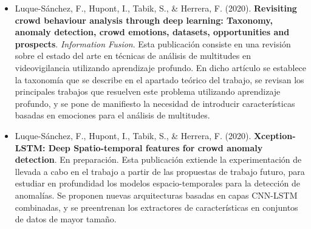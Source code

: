 \documentclass[../main.tex]{memoir}
\begin{document}
\begin{itemize}
\item Luque-Sánchez, F., Hupont, I., Tabik, S., \& Herrera,
  F. (2020). \textbf{Revisiting crowd behaviour analysis through deep
  learning: Taxonomy, anomaly detection, crowd emotions, datasets,
  opportunities and prospects}. \textit{Information Fusion}. Esta
  publicación consiste en una revisión sobre el estado del arte en
  técnicas de análisis de multitudes en videovigilancia utilizando
  aprendizaje profundo. En dicho artículo se establece la taxonomía
  que se describe en el apartado teórico del trabajo, se revisan los
  principales trabajos que resuelven este problema utilizando
  aprendizaje profundo, y se pone de manifiesto la necesidad de
  introducir características basadas en emociones para el análisis de
  multitudes.
\item Luque-Sánchez, F., Hupont, I., Tabik, S., \& Herrera,
  F. (2020). \textbf{Xception-LSTM: Deep Spatio-temporal features for
    crowd anomaly detection}. En preparación. Esta publicación
  extiende la experimentación de llevada a cabo en el trabajo a partir
  de las propuestas de trabajo futuro, para estudiar en profundidad
  los modelos espacio-temporales para la detección de anomalías. Se
  proponen nuevas arquitecturas basadas en capas CNN-LSTM combinadas,
  y se preentrenan los extractores de características en conjuntos
  de datos de mayor tamaño.
\end{itemize}
\end{document}
